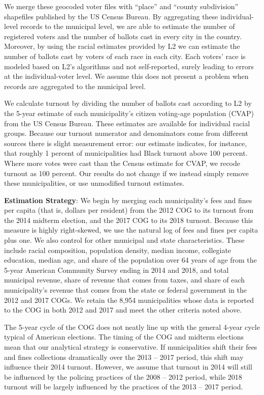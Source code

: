 \documentclass[
  12pt,
]{article}
\begin{document}
We merge these geocoded voter files with ``place'' and ``county subdivision'' shapefiles published by the US Census Bureau. By aggregating these individual-level records to the municipal level, we are able to estimate the number of registered voters and the number of ballots cast in every city in the country. Moreover, by using the racial estimates provided by L2 we can estimate the number of ballots cast by voters of each race in each city. Each voters' race is modeled based on L2's algorithms and not self-reported, surely leading to errors at the individual-voter level. We assume this does not present a problem when records are aggregated to the municipal level.

We calculate turnout by dividing the number of ballots cast according to L2 by the 5-year estimate of each municipality's citizen voting-age population (CVAP) from the US Census Bureau. These estimates are available for individual racial groups. Because our turnout numerator and denominators come from different sources there is slight measurement error: our estimate indicates, for instance, that roughly 1 percent of municipalities had Black turnout above 100 percent. Where more votes were cast than the Census estimate for CVAP, we recode turnout as 100 percent. Our results do not change if we instead simply remove these municipalities, or use unmodified turnout estimates.

\textbf{Estimation Strategy}: We begin by merging each municipality's fees and fines per capita (that is, dollars per resident) from the 2012 COG to its turnout from the 2014 midterm election, and the 2017 COG to its 2018 turnout. Because this measure is highly right-skewed, we use the natural log of fees and fines per capita plus one. We also control for other municipal and state characteristics. These include racial composition, population density, median income, collegiate education, median age, and share of the population over 64 years of age from the 5-year American Community Survey ending in 2014 and 2018, and total municipal revenue, share of revenue that comes from taxes, and share of each municipality's revenue that comes from the state or federal government in the 2012 and 2017 COGs. We retain the 8,954 municipalities whose data is reported to the COG in both 2012 and 2017 and meet the other criteria noted above.

The 5-year cycle of the COG does not neatly line up with the general 4-year cycle typical of American elections. The timing of the COG and midterm elections mean that our analytical strategy is conservative. If municipalities shift their fees and fines collections dramatically over the 2013 -- 2017 period, this shift may influence their 2014 turnout. However, we assume that turnout in 2014 will still be influenced by the policing practices of the 2008 -- 2012 period, while 2018 turnout will be largely influenced by the practices of the 2013 -- 2017 period.
\end{document}
